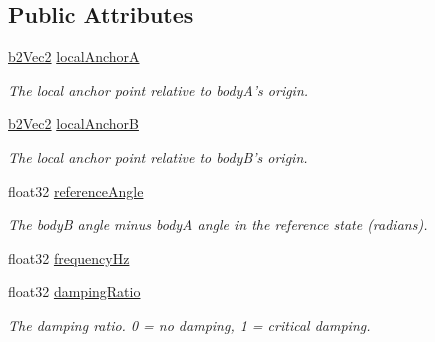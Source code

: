 \subsection*{Public Attributes}
\begin{DoxyCompactItemize}
\item 
\hypertarget{structb2_weld_joint_def_a3b04af6164bb32efc3f5cf3e8d2b7109}{\hyperlink{structb2_vec2}{b2\-Vec2} \hyperlink{structb2_weld_joint_def_a3b04af6164bb32efc3f5cf3e8d2b7109}{local\-Anchor\-A}}\label{structb2_weld_joint_def_a3b04af6164bb32efc3f5cf3e8d2b7109}

\begin{DoxyCompactList}\small\item\em The local anchor point relative to body\-A's origin. \end{DoxyCompactList}\item 
\hypertarget{structb2_weld_joint_def_a528262b92dac10de37411ad8c5637149}{\hyperlink{structb2_vec2}{b2\-Vec2} \hyperlink{structb2_weld_joint_def_a528262b92dac10de37411ad8c5637149}{local\-Anchor\-B}}\label{structb2_weld_joint_def_a528262b92dac10de37411ad8c5637149}

\begin{DoxyCompactList}\small\item\em The local anchor point relative to body\-B's origin. \end{DoxyCompactList}\item 
\hypertarget{structb2_weld_joint_def_a31aeb208f15842091c55e3f1bab6d8f1}{float32 \hyperlink{structb2_weld_joint_def_a31aeb208f15842091c55e3f1bab6d8f1}{reference\-Angle}}\label{structb2_weld_joint_def_a31aeb208f15842091c55e3f1bab6d8f1}

\begin{DoxyCompactList}\small\item\em The body\-B angle minus body\-A angle in the reference state (radians). \end{DoxyCompactList}\item 
float32 \hyperlink{structb2_weld_joint_def_abf42ce852914af845e9203b341f55c87}{frequency\-Hz}
\item 
\hypertarget{structb2_weld_joint_def_ace1f0131610f14558f3dbaaed7b10e24}{float32 \hyperlink{structb2_weld_joint_def_ace1f0131610f14558f3dbaaed7b10e24}{damping\-Ratio}}\label{structb2_weld_joint_def_ace1f0131610f14558f3dbaaed7b10e24}

\begin{DoxyCompactList}\small\item\em The damping ratio. 0 = no damping, 1 = critical damping. \end{DoxyCompactList}\end{DoxyCompactItemize}


